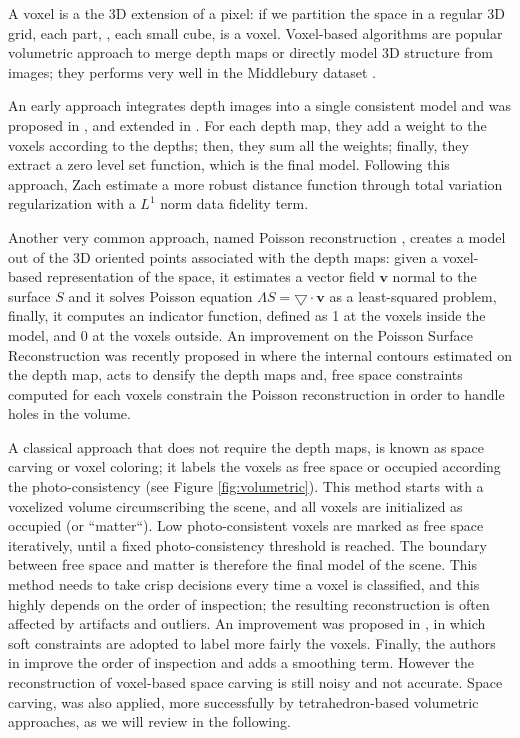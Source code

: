 A voxel is a the 3D extension of a pixel: if we partition the space in a regular 3D grid, each part, \ie, each small cube, is a voxel.
Voxel-based  algorithms are popular volumetric approach to merge depth maps or directly model 3D structure from images; they performs very well in the Middlebury dataset \cite{seitz_et_al06}.

An early approach integrates depth images into a single consistent model and was proposed in \cite{curless1996volumetric}, and extended in \cite{goesele2006multi}. For each depth map, they add a  weight to the voxels according to the depths; then, they sum all the weights; finally, they extract a zero level set function, which is the final model.
Following this approach, Zach \etal \cite{zach2007globally} estimate a more robust distance function through total variation regularization with a $L^1$ norm data fidelity term.

Another very common approach, named  Poisson reconstruction \cite{kazhdan2006poisson}, creates a model out of the 3D oriented points associated with the depth maps: given a voxel-based representation of the space,  it estimates a vector field $\mathbf{v}$ normal to the surface $\mathit{S}$ and it solves Poisson equation $\Lambda \mathit{S} = \bigtriangledown \cdot \mathbf{v}$ as a least-squared problem, finally, it computes an indicator function, defined as 1 at the voxels inside the model, and 0 at the voxels outside.
An improvement on the Poisson Surface Reconstruction was recently proposed in \cite{shan2014occluding} where the internal contours estimated on the depth map, acts to densify the depth maps and, free space constraints computed for each voxels constrain the Poisson reconstruction in order to handle holes in the volume.

A classical approach that does not require the depth maps, is known as space carving or voxel coloring; it labels the voxels as free space or occupied according the photo-consistency  \cite{seitz1999photorealistic,kutulakos_seitz05} (see Figure \ref{fig:volumetric}). 
This method starts with a voxelized volume circumscribing the scene, and all voxels are initialized as occupied (or ``matter``). 
Low photo-consistent voxels are marked as free space iteratively, until a fixed photo-consistency threshold is reached. The boundary between free space and matter is therefore the final model of the scene. 
This method needs to take crisp decisions every time a voxel is classified, and this highly depends on the order of inspection; the resulting reconstruction is often affected by artifacts and outliers.
An improvement was proposed in \cite{broadhurst2001probabilistic}, in which soft constraints are adopted to label more fairly the voxels.
Finally, the authors in \cite{yang2003multi} improve the order of inspection and adds a smoothing term. 
However the reconstruction of voxel-based space carving is still noisy and not  accurate.
Space carving, was also applied, more successfully by tetrahedron-based volumetric approaches, as we will  review in the following.

